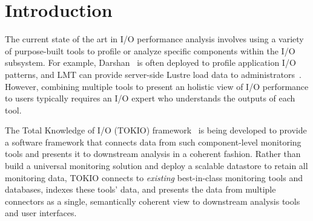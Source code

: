 \section{Introduction}

The current state of the art in I/O performance analysis involves using a variety of purpose-built tools to profile or analyze specific components within the I/O subsystem.  For example, Darshan~\cite{Carns2009} is often deployed to profile application I/O patterns, and LMT can provide server-side Lustre load data to administrators~\cite{Keopp2014}.  However, combining multiple tools to present an holistic view of I/O performance to users typically requires an I/O expert who understands the outputs of each tool.

The Total Knowledge of I/O (TOKIO) framework~\cite{Lockwood2017} is being developed to provide a software framework that connects data from such component-level monitoring tools and presents it to downstream analysis in a coherent fashion.  Rather than build a universal monitoring solution and deploy a scalable datastore to retain all monitoring data, TOKIO connects to \emph{existing} best-in-class monitoring tools and databases, indexes these tools' data, and presents the data from multiple connectors as a single, semantically coherent view to downstream analysis tools and user interfaces.